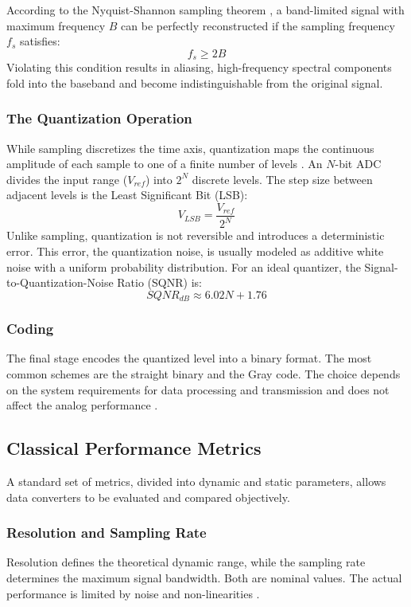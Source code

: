According to the Nyquist-Shannon sampling theorem \cite{shannon_1949}, a band-limited signal with maximum frequency $B$ can be perfectly reconstructed if the sampling frequency $f_s$ satisfies:
\begin{equation}
  f_s \geq 2B
\end{equation}
Violating this condition results in aliasing, high-frequency spectral components fold into the baseband and become indistinguishable from the original signal.

\subsubsection{The Quantization Operation}
While sampling discretizes the time axis, quantization maps the continuous amplitude of each sample to one of a finite number of levels \cite{johns_martin_2012}. An $N$-bit ADC divides the input range ($V_{ref}$) into $2^N$ discrete levels. The step size between adjacent levels is the Least Significant Bit (LSB):
\begin{equation}
  V_{LSB} = \frac{V_{ref}}{2^N}
\end{equation}
Unlike sampling, quantization is not reversible and introduces a deterministic error. This error, the quantization noise, is usually modeled as additive white noise with a uniform probability distribution. For an ideal quantizer, the Signal-to-Quantization-Noise Ratio (SQNR) is:
\begin{equation}
  SQNR_{dB} \approx 6.02N + 1.76
\end{equation}

\subsubsection{Coding}
The final stage encodes the quantized level into a binary format. The most common schemes are the straight binary and the Gray code. The choice depends on the system requirements for data processing and transmission and does not affect the analog performance \cite{baker_cmos_2010}.

\subsection{Classical Performance Metrics}

A standard set of metrics, divided into dynamic and static parameters, allows data converters to be evaluated and compared objectively.

\subsubsection{Resolution and Sampling Rate}
Resolution defines the theoretical dynamic range, while the sampling rate determines the maximum signal bandwidth. Both are nominal values. The actual performance is limited by noise and non-linearities \cite{johns_martin_2012}.

